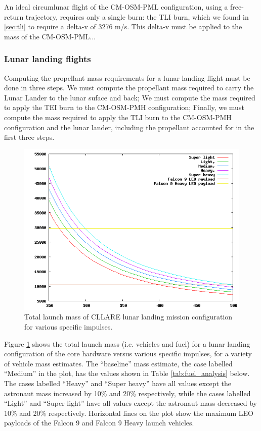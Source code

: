 \documentclass{report}
\begin{document}
An ideal circumlunar flight of the CM-OSM-PML configuration, using a free-return trajectory, requires only a single burn: the TLI burn, which we found in \ref{sec:tli} to require a delta-v of 3276 m/s.  This delta-v must be applied to the mass of the CM-OSM-PML...

\subsubsection{Lunar landing flights}

Computing the propellant mass requirements for a lunar landing flight must be done in three steps.  We must compute the propellant mass required to carry the Lunar Lander to the lunar suface and back; We must compute the mass required to apply the TEI burn to the CM-OSM-PMH configuration; Finally, we must compute the mass required to apply the TLI burn to the CM-OSM-PMH configuration and the lunar lander, including the propellant accounted for in the first three steps.

\begin{figure}[h] \label{fig:fuel_analysis}
\includegraphics[scale=0.6]{images/fuel_analysis}
\caption{Total launch mass of CLLARE lunar landing mission configuration for various specific impulses.}
\end{figure}

Figure \ref{fig:fuel_analysis} shows the total launch mass (i.e. vehicles and fuel) for a lunar landing configuration of the core hardware versus various specific impulses, for a variety of vehicle mass estimates.  The ``baseline'' mass estimate, the case labelled ``Medium'' in the plot, has the values shown in Table \ref{tab:fuel_analysis} below.  The cases labelled ``Heavy'' and ``Super heavy'' have all values except the astronaut mass increased by 10\% and 20\% respectively, while the cases labelled ``Light'' and ``Super light'' have all values except the astronaut mass decreased by 10\% and 20\% respectively.  Horizontal lines on the plot show the maximum LEO payloads of the Falcon 9 and Falcon 9 Heavy launch vehicles.
\end{document}
